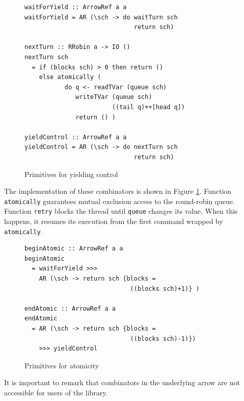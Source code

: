 \documentclass[times, 10pt,twocolumn]{article}
\begin{document}
{\begin{figure}[t]
\begin{Verbatim}[fontsize=\footnotesize]
waitForYield :: ArrowRef a a
waitForYield = AR (\sch -> do waitTurn sch 
                              return sch)

nextTurn :: RRobin a -> IO ()
nextTurn sch 
  = if (blocks sch) > 0 then return ()
    else atomically (
           do q <- readTVar (queue sch)
              writeTVar (queue sch) 
                        ((tail q)++[head q])
              return () )

yieldControl :: ArrowRef a a
yieldControl = AR (\sch -> do nextTurn sch 
                              return sch)
\end{Verbatim}
\caption{\label{fig:yield} Primitives for yielding control}
\end{figure}
The implementation of these combinators is shown in Figure 
\ref{fig:yield}.  
Function \texttt{atomically} guarantees mutual exclusion access 
to the round-robin queue.
Function \texttt{retry} blocks the thread until 
\texttt{queue} changes its value. When this happens, it resumes 
its execution from the first command wrapped by \texttt{atomically}.
\begin{figure}
\begin{Verbatim}[fontsize=\footnotesize]
beginAtomic :: ArrowRef a a 
beginAtomic 
  = waitForYield >>>
    AR (\sch -> return sch {blocks = 
                             ((blocks sch)+1)} )

endAtomic :: ArrowRef a a
endAtomic 
  = AR (\sch -> return sch {blocks = 
                             ((blocks sch)-1)})
    >>> yieldControl
\end{Verbatim}
\caption{Primitives for atomicity}
\label{fig:atomicity}
\end{figure}
It is important to remark that combinators in the underlying 
arrow are not accessible for users of the library.
 

}
\end{document}
